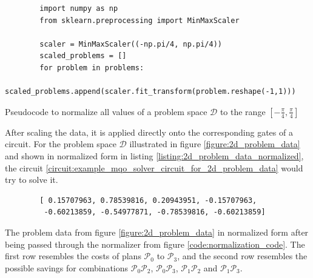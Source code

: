 \begin{listing}[!ht]
    \centering
    \begin{verbatim}
        import numpy as np
        from sklearn.preprocessing import MinMaxScaler
        
        scaler = MinMaxScaler((-np.pi/4, np.pi/4))
        scaled_problems = []
        for problem in problems:
            scaled_problems.append(scaler.fit_transform(problem.reshape(-1,1)))
    \end{verbatim}
    \caption{Pseudocode to normalize all values of a problem space $\mathcal{D}$ to the range $\left[-\frac{\pi}{4},\frac{\pi}{4}\right]$}
    \label{code:normalization_code}
\end{listing}

After scaling the data, it is applied directly onto the corresponding gates of a circuit. For the problem space $\mathcal{D}$ illustrated in figure \ref{figure:2d_problem_data} and shown in normalized form in listing \ref{listing:2d_problem_data_normalized}, the circuit \ref{circuit:example_mqo_solver_circuit_for_2d_problem_data} would try to solve it.

\begin{listing}[!ht]
    \centering
    \begin{verbatim}
        [ 0.15707963, 0.78539816, 0.20943951, -0.15707963,
         -0.60213859, -0.54977871, -0.78539816, -0.60213859]
    \end{verbatim}
    \caption{The problem data from figure \ref{figure:2d_problem_data} in normalized form after being passed through the normalizer from figure \ref{code:normalization_code}. The first row resembles the costs of plans $\mathcal{P}_0$ to $\mathcal{P}_3$, and the second row resembles the possible savings for combinations $\mathcal{P}_0\mathcal{P}_2$, $\mathcal{P}_0\mathcal{P}_3$, $\mathcal{P}_1\mathcal{P}_2$ and $\mathcal{P}_1\mathcal{P}_3$.}
    \label{listing:2d_problem_data_normalized}
\end{listing}

